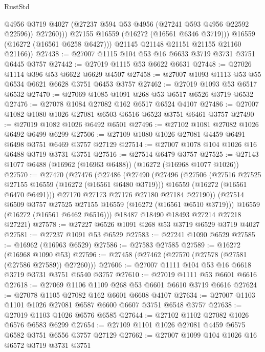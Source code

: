 \begin{lexlean}{RustStd}
\begin{coremodule}
                  @4956
                  @3719
                  @4027
                  (@27237 @594 @53 @4956 (@27241 @593 @4956 @22592 @22596))
                  @27260)))
            @27155
            @16559
            (@16272 (@16561 @6346 @3719)))
          @16559
          (@16272 (@16561 @6258 @6427)))
        @21145
        @21148
        @21151
        @21155
        @21160
        @21166))
@27438 := @27007 @1115 @104 @53 @16 @6633 @3719 @3731 @3751 @6445 @3757
@27442 := @27019 @1115 @53 @6622 @6631
@27448 := @27026 @1114 @396 @53 @6622 @6629 @4507
@27458 := @27007 @1093 @1113 @53 @55 @6534 @6621 @6628 @3751 @6453 @3757
@27462 := @27019 @1093 @53 @6517 @6532
@27470 := @27069 @1085 @1091 @268 @53 @6517 @6526 @3719 @6532
@27476 := @27078 @1084 @27082 @162 @6517 @6524 @4107
@27486 := @27007 @1082 @1080 @1026 @27081 @6503 @6516 @6523 @3751 @6461 @3757
@27490 := @27019 @1082 @1026 @6492 @6501
@27496 := @27102 @1081 @27082 @1026 @6492 @6499 @6299
@27506 := @27109 @1080 @1026 @27081 @4459 @6491 @6498 @3751 @6469 @3757 @27129
@27514 := @27007 @1078 @104 @1026 @16 @6488 @3719 @3731 @3751
@27516 := @27514 @6479 @3757
@27525 := @27143 @1077 @6488 (@16962 (@16963 @6488)) (@16272 (@16968 @1077 @1026))
@27570 := @27470
    (@27476
      (@27486
        (@27490
          (@27496
            (@27506
              (@27516 @27525 @27155 @16559 (@16272 (@16561 @6480 @3719)))
              @16559
              (@16272 (@16561 @6470 @6491)))
            @27170
            @27173
            @27176
            @27180
            @27184
            @27190))
        (@27514 @6509 @3757 @27525 @27155 @16559 (@16272 (@16561 @6510 @3719)))
        @16559
        (@16272 (@16561 @6462 @6516)))
      @18487
      @18490
      @18493
      @27214
      @27218
      @27221)
@27578 := @27227 @6526 @1091 @268 @53 @3719 @6529 @3719 @4027
@27581 := @27237 @1091 @53 @6529
@27583 := @27241 @1090 @6529
@27585 := @16962 (@16963 @6529)
@27586 := @27583 @27585
@27589 := @16272 (@16968 @1090 @53)
@27596 := @27458 (@27462 (@27570 (@27578 (@27581 (@27586 @27589)) @27260)))
@27606 := @27007 @1111 @104 @53 @16 @6618 @3719 @3731 @3751 @6540 @3757
@27610 := @27019 @1111 @53 @6601 @6616
@27618 := @27069 @1106 @1109 @268 @53 @6601 @6610 @3719 @6616
@27624 := @27078 @1105 @27082 @162 @6601 @6608 @4107
@27634 := @27007 @1103 @1101 @1026 @27081 @6587 @6600 @6607 @3751 @6548 @3757
@27638 := @27019 @1103 @1026 @6576 @6585
@27644 := @27102 @1102 @27082 @1026 @6576 @6583 @6299
@27654 := @27109 @1101 @1026 @27081 @4459 @6575 @6582 @3751 @6556 @3757 @27129
@27662 := @27007 @1099 @104 @1026 @16 @6572 @3719 @3731 @3751

\end{coremodule}
\end{lexlean}
